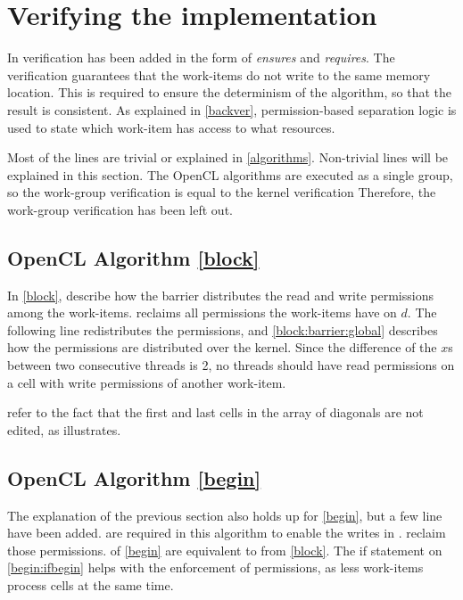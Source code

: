 \section{Verifying the implementation} \label{q3}
In  verification has been added in the form of \textit{ensures} and \textit{requires}.
The verification guarantees that the work-items do not write to the same memory location.
This is required to ensure the determinism of the algorithm, so that the result is consistent.
As explained in \cref{backver}, permission-based separation logic is used to state which work-item has access to what resources.

Most of the lines are trivial or explained in \cref{algorithms}.
Non-trivial lines will be explained in this section.
The OpenCL algorithms are executed as a single group, so the work-group verification is equal to the kernel verification
Therefore, the work-group verification has been left out.

\subsection{OpenCL Algorithm \ref*{block}} \label{ver:block}
In \cref{block},  describe how the barrier distributes the read and write permissions among the work-items.
 reclaims all permissions the work-items have on $d$.
The following line redistributes the permissions, and \cref{block:barrier:global} describes how the permissions are distributed over the kernel.
Since the difference of the $x$s between two consecutive threads is 2, no threads should have read permissions on a cell with write permissions of another work-item.

 refer to the fact that the first and last cells in the array of diagonals are not edited, as  illustrates.

\subsection{OpenCL Algorithm \ref*{begin}} \label{ver:begin}
The explanation of the previous section also holds up for \cref{begin}, but a few line have been added.
 are required in this algorithm to enable the writes in .
 reclaim those permissions.
 of \cref{begin} are equivalent to  from \cref{block}.
The if statement on \cref{begin:ifbegin} helps with the enforcement of permissions, as less work-items process cells at the same time.

